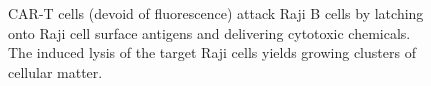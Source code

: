 \begin{figure}[h]%
    \centering
    \qquad
    \qquad
	\qquad
\caption{CAR-T cells (devoid of fluorescence) attack Raji B cells by latching onto Raji cell surface antigens and delivering cytotoxic chemicals. The induced lysis of the target Raji cells yields growing clusters of cellular matter.}
\label{fig:cluster_frames}
\end{figure}

%

